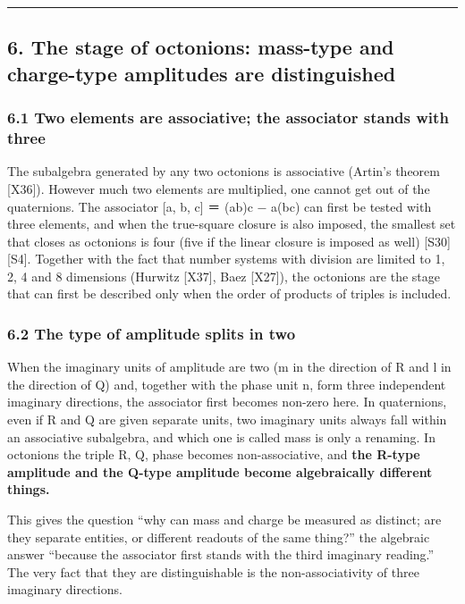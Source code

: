 \documentclass[
  a4paper,
]{article}
\begin{document}
\begin{center}\rule{0.5\linewidth}{0.5pt}\end{center}

\subsection{6. The stage of octonions: mass-type and charge-type
amplitudes are
distinguished}\label{the-stage-of-octonions-mass-type-and-charge-type-amplitudes-are-distinguished}

\subsubsection{6.1 Two elements are associative; the associator stands
with
three}\label{two-elements-are-associative-the-associator-stands-with-three}

The subalgebra generated by any two octonions is associative (Artin's
theorem {[}X36{]}). However much two elements are multiplied, one cannot
get out of the quaternions. The associator {[}a, b, c{]} ＝ (ab)c −
a(bc) can first be tested with three elements, and when the true-square
closure is also imposed, the smallest set that closes as octonions is
four (five if the linear closure is imposed as well) {[}S30{]} {[}S4{]}.
Together with the fact that number systems with division are limited to
1, 2, 4 and 8 dimensions (Hurwitz {[}X37{]}, Baez {[}X27{]}), the
octonions are the stage that can first be described only when the order
of products of triples is included.

\subsubsection{6.2 The type of amplitude splits in
two}\label{the-type-of-amplitude-splits-in-two}

When the imaginary units of amplitude are two (m in the direction of R
and l in the direction of Q) and, together with the phase unit n, form
three independent imaginary directions, the associator first becomes
non-zero here. In quaternions, even if R and Q are given separate units,
two imaginary units always fall within an associative subalgebra, and
which one is called mass is only a renaming. In octonions the triple R,
Q, phase becomes non-associative, and \textbf{the R-type amplitude and
the Q-type amplitude become algebraically different things.}

This gives the question ``why can mass and charge be measured as
distinct; are they separate entities, or different readouts of the same
thing?'' the algebraic answer ``because the associator first stands with
the third imaginary reading.'' The very fact that they are
distinguishable is the non-associativity of three imaginary directions.
\end{document}
